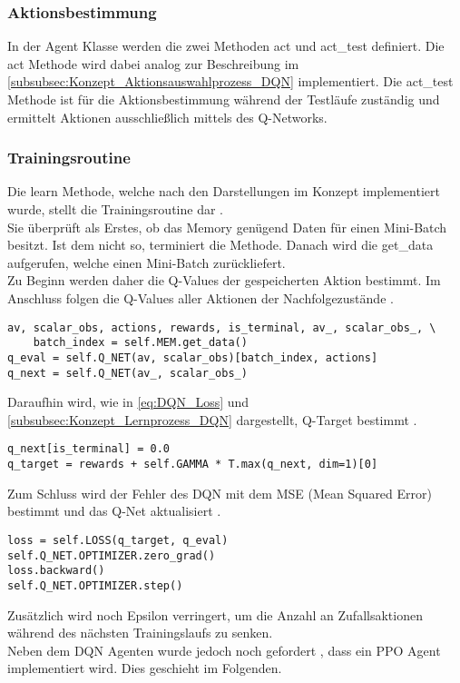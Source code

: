 \subsubsection{Aktionsbestimmung} \label{subsubsec:Implementierung_Aktionsbestimmung_DQN}
In der Agent Klasse werden die zwei Methoden act und act\_test definiert. Die act Methode wird dabei analog zur Beschreibung im \autoref{subsubsec:Konzept_Aktionsauswahlprozess_DQN} implementiert.
Die act\_test Methode ist für die Aktionsbestimmung während der Testläufe zuständig und ermittelt Aktionen ausschließlich mittels des Q-Networks.

\subsubsection{Trainingsroutine} \label{subsubsec:Implementierung_Trainingsroutine_DQN}
Die learn Methode, welche nach den Darstellungen im Konzept implementiert wurde, stellt die Trainingsroutine dar .\\
Sie überprüft als Erstes, ob das Memory genügend Daten für einen Mini-Batch besitzt. Ist dem nicht so, terminiert die Methode.
Danach wird die get\_data aufgerufen, welche einen Mini-Batch zurückliefert.\\
Zu Beginn werden daher die Q-Values der gespeicherten Aktion bestimmt. Im Anschluss folgen die Q-Values aller Aktionen der Nachfolgezustände .
\begin{lstlisting}[caption=Bestimmung der Q-Values, label=code:Bestimmung_Q-Values, style=Python]
av, scalar_obs, actions, rewards, is_terminal, av_, scalar_obs_, \
	batch_index = self.MEM.get_data()
q_eval = self.Q_NET(av, scalar_obs)[batch_index, actions]
q_next = self.Q_NET(av_, scalar_obs_)
\end{lstlisting}
Daraufhin wird, wie in \autoref{eq:DQN_Loss} und \autoref{subsubsec:Konzept_Lernprozess_DQN} dargestellt, Q-Target bestimmt .
\begin{lstlisting}[caption=Bestimmung von Q-Target, label=code:Bestimmung_Q-Target, style=Python]
q_next[is_terminal] = 0.0
q_target = rewards + self.GAMMA * T.max(q_next, dim=1)[0]
\end{lstlisting}
Zum Schluss wird der Fehler des DQN mit dem MSE (Mean Squared Error) bestimmt und das Q-Net aktualisiert .
\begin{lstlisting}[caption=Bestimmung des DQN Loss \& Update des Q-Networks, label=code:Bestimmung_DQN-Loss, style=Python]
loss = self.LOSS(q_target, q_eval)
self.Q_NET.OPTIMIZER.zero_grad()
loss.backward()
self.Q_NET.OPTIMIZER.step()
\end{lstlisting}
Zusätzlich wird noch Epsilon verringert, um die Anzahl an Zufallsaktionen während des nächsten Trainingslaufs zu senken.\\
Neben dem DQN Agenten wurde jedoch noch gefordert \fullref{subsec:Anforderungen_Diversität}, dass ein PPO Agent implementiert wird. Dies geschieht im Folgenden.


